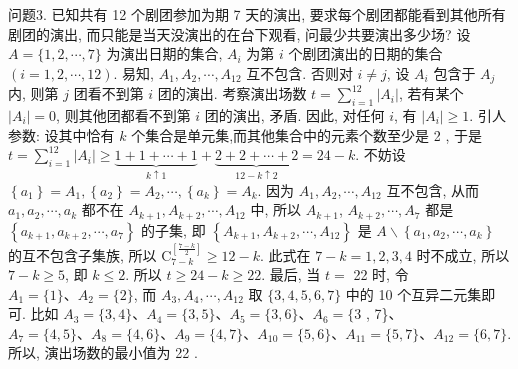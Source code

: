 问题3. 已知共有 12 个剧团参加为期 7 天的演出, 要求每个剧团都能看到其他所有剧团的演出, 而只能是当天没演出的在台下观看, 问最少共要演出多少场?
设 $A=\{1,2, \cdots, 7\}$ 为演出日期的集合, $A_i$ 为第 $i$ 个剧团演出的日期的集合 $(i=1,2, \cdots, 12)$. 易知, $A_1, A_2, \cdots, A_{12}$ 互不包含.
否则对 $i \neq j$, 设 $A_i$ 包含于 $A_j$ 内, 则第 $j$ 团看不到第 $i$ 团的演出.
考察演出场数 $t=\sum_{i=1}^{12}\left|A_i\right|$, 若有某个 $\left|A_i\right|=0$, 则其他团都看不到第 $i$ 团的演出, 矛盾.
因此, 对任何 $i$, 有 $\left|A_i\right| \geqslant 1$. 引人参数: 设其中恰有 $k$ 个集合是单元集,而其他集合中的元素个数至少是 2 , 于是 $t=\sum_{i=1}^{12}\left|A_i\right| \geqslant \underbrace{1+1+\cdots+1}_{k \uparrow 1}+\underbrace{2+2+\cdots+2}_{12-k \uparrow 2}= 24-k$. 不妨设 $\left\{a_1\right\}=A_1,\left\{a_2\right\}=A_2, \cdots,\left\{a_k\right\}=A_k$. 因为 $A_1, A_2, \cdots, A_{12}$ 互不包含, 从而 $a_1, a_2, \cdots, a_k$ 都不在 $A_{k+1}, A_{k+2}, \cdots, A_{12}$ 中, 所以 $A_{k+1}$, $A_{k+2}, \cdots, A_7$ 都是 $\left\{a_{k+1}, a_{k+2}, \cdots, a_7\right\}$ 的子集, 即 $\left\{A_{k+1}, A_{k+2}, \cdots, A_{12}\right\}$ 是 $A \backslash\left\{a_1, a_2, \cdots, a_k\right\}$ 的互不包含子集族, 所以 $\mathrm{C}_{7-k}^{\left[\frac{7-k}{2}\right]} \geqslant 12-k$. 此式在 $7-k= 1,2,3,4$ 时不成立, 所以 $7-k \geqslant 5$, 即 $k \leqslant 2$. 所以 $t \geqslant 24-k \geqslant 22$. 最后, 当 $t=$ 22 时, 令 $A_1=\{1\} 、 A_2=\{2\}$, 而 $A_3, A_4, \cdots, A_{12}$ 取 $\{3,4,5,6,7\}$ 中的 10 个互异二元集即可.
比如 $A_3=\{3,4\} 、 A_4=\{3,5\} 、 A_5=\{3,6\} 、 A_6=\{3$ , 7\}、 $A_7=\{4,5\} 、 A_8=\{4,6\} 、 A_9=\{4,7\} 、 A_{10}=\{5,6\} 、 A_{11}=\{5,7\} 、 A_{12}=\{6,7\}$. 所以, 演出场数的最小值为 22 .




